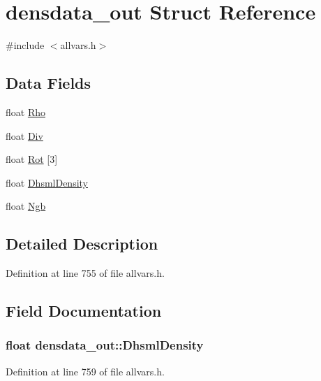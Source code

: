 \hypertarget{structdensdata__out}{
\section{densdata\_\-out Struct Reference}
\label{structdensdata__out}
}


{\ttfamily \#include $<$allvars.h$>$}

\subsection*{Data Fields}
\begin{DoxyCompactItemize}
\item 
float \hyperlink{structdensdata__out_a7a4edc5de1283464a658fb089594d11c}{Rho}
\item 
float \hyperlink{structdensdata__out_af3c2ce61474da5764ac1b50155c0aa7e}{Div}
\item 
float \hyperlink{structdensdata__out_a748be7d0e50757980389fb667d6d022b}{Rot} \mbox{[}3\mbox{]}
\item 
float \hyperlink{structdensdata__out_a4a4b92bd40642207d3e6748ae90c8d49}{DhsmlDensity}
\item 
float \hyperlink{structdensdata__out_ad78ddc3f9c8fb77b2e98f04d5cd2dfb4}{Ngb}
\end{DoxyCompactItemize}


\subsection{Detailed Description}


Definition at line 755 of file allvars.h.



\subsection{Field Documentation}
\hypertarget{structdensdata__out_a4a4b92bd40642207d3e6748ae90c8d49}{
\subsubsection[{DhsmlDensity}]{\setlength{\rightskip}{0pt plus 5cm}float {\bf densdata\_\-out::DhsmlDensity}}}
\label{structdensdata__out_a4a4b92bd40642207d3e6748ae90c8d49}


Definition at line 759 of file allvars.h.



